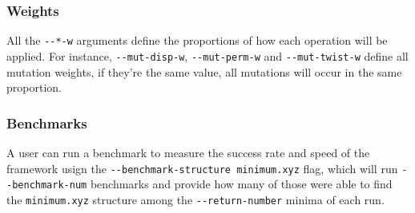 \documentclass[
  article,
  12pt,
  oneside,
  english,
  brazil,
  sumario=abnt-6027-2012,
]{abntex2}
\begin{document}
\subsubsection{Weights}
All the \lstinline{--*-w} arguments define the proportions of how each operation will be applied.
For instance, \lstinline{--mut-disp-w}, \lstinline{--mut-perm-w} and \lstinline{--mut-twist-w} define all mutation weights, if they're the same value, all mutations will occur in the same proportion.

\subsubsection{Benchmarks}
A user can run a benchmark to measure the success rate and speed of the framework usign the \lstinline{--benchmark-structure minimum.xyz} flag, which will run \lstinline{--benchmark-num} benchmarks and provide how many of those were able to find the \lstinline{minimum.xyz} structure among the \lstinline{--return-number} minima of each run.
\end{document}
